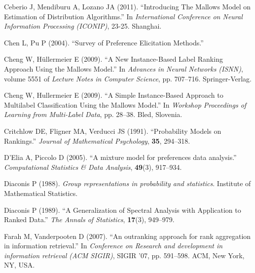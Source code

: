 \documentclass[article,nojss]{jss}
\begin{document}
\begin{thebibliography}{44}
Ceberio J, Mendiburu A, Lozano JA (2011).
\newblock \enquote{{Introducing The Mallows Model on Estimation of Distribution
  Algorithms}.}
\newblock In \emph{International Conference on Neural Information Processing
  (ICONIP)}, 23-25. Shanghai.

Chen L, Pu P (2004).
\newblock \enquote{{Survey of Preference Elicitation Methods}.}

Cheng W, H\"{u}llermeier E (2009).
\newblock \enquote{{A New Instance-Based Label Ranking Approach Using the
  Mallows Model}.}
\newblock In \emph{Advances in Neural Networks (ISNN)}, volume 5551 of
  \emph{Lecture Notes in Computer Science}, pp. 707--716. Springer-Verlag.

Cheng W, Hullermeier E (2009).
\newblock \enquote{{A Simple Instance-Based Approach to Multilabel
  Classification Using the Mallows Model}.}
\newblock In \emph{Workshop Proceedings of Learning from Multi-Label Data}, pp.
  28--38. Bled, Slovenia.

Critchlow DE, Fligner MA, Verducci JS (1991).
\newblock \enquote{{Probability Models on Rankings}.}
\newblock \emph{Journal of Mathematical Psychology}, \textbf{35}, 294--318.

D'Elia A, Piccolo D (2005).
\newblock \enquote{{A mixture model for preferences data analysis}.}
\newblock \emph{Computational Statistics \& Data Analysis}, \textbf{49}(3),
  917--934.

Diaconis P (1988).
\newblock \emph{{Group representations in probability and statistics}}.
\newblock Institute of Mathematical Statistics.

Diaconis P (1989).
\newblock \enquote{{A Generalization of Spectral Analysis with Application to
  Ranked Data}.}
\newblock \emph{The Annals of Statistics}, \textbf{17}(3), 949--979.

Farah M, Vanderpooten D (2007).
\newblock \enquote{{An outranking approach for rank aggregation in information
  retrieval}.}
\newblock In \emph{Conference on Research and development in information
  retrieval (ACM SIGIR)}, SIGIR '07, pp. 591--598. ACM, New York, NY, USA.


\end{thebibliography}
\end{document}
